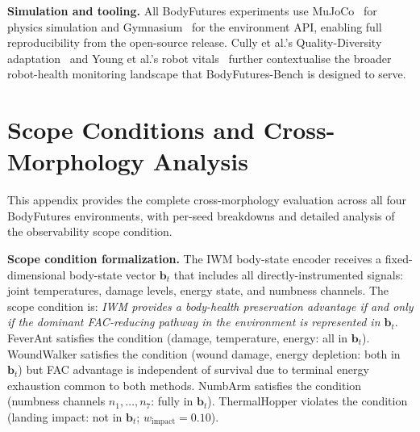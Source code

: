 \documentclass{article}
\begin{document}
{\textbf{Simulation and tooling.}
All BodyFutures experiments use MuJoCo~\citep{todorov2012mujoco} for physics simulation and Gymnasium~\citep{towers2024gymnasium} for the environment API, enabling full reproducibility from the open-source release. Cully et al.'s Quality-Diversity adaptation~\citep{cully2015robots} and Young et al.'s robot vitals~\citep{young2022robotvitals} further contextualise the broader robot-health monitoring landscape that BodyFutures-Bench is designed to serve.

\vspace{-4pt}
\section{Scope Conditions and Cross-Morphology Analysis}
\label{app:scope}
This appendix provides the complete cross-morphology evaluation across all four BodyFutures environments, with per-seed breakdowns and detailed analysis of the observability scope condition.

\textbf{Scope condition formalization.}
The IWM body-state encoder receives a fixed-dimensional body-state vector $\mathbf{b}_t$ that includes all directly-instrumented signals: joint temperatures, damage levels, energy state, and numbness channels. The scope condition is: \emph{IWM provides a body-health preservation advantage if and only if the dominant FAC-reducing pathway in the environment is represented in $\mathbf{b}_t$}. FeverAnt satisfies the condition (damage, temperature, energy: all in $\mathbf{b}_t$). WoundWalker satisfies the condition (wound damage, energy depletion: both in $\mathbf{b}_t$) but FAC advantage is independent of survival due to terminal energy exhaustion common to both methods. NumbArm satisfies the condition (numbness channels $n_1,\ldots,n_7$: fully in $\mathbf{b}_t$). ThermalHopper violates the condition (landing impact: not in $\mathbf{b}_t$; $w_\mathrm{impact}=0.10$).

}
\end{document}
